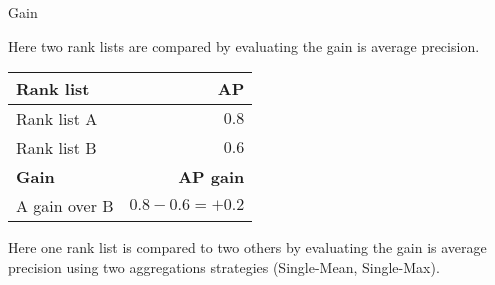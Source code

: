 \begin{example}
  \centering
  \caption{Gain}
  \label{ex:gain}

  \begin{subexample}{\linewidth}
    \centering

    Here two rank lists are compared by evaluating the gain is average precision.

    \vspace{0.2cm}

    \begin{tabular}{l r}
      \toprule
      \textbf{Rank list} & \textbf{AP} \\
      \midrule
      Rank list A & $0.8$ \\
      Rank list B & $0.6$ \\
      \midrule
      \textbf{Gain} & \textbf{AP gain} \\
      A gain over B & $0.8 - 0.6 = +0.2$ \\
      \bottomrule
    \end{tabular}
  \end{subexample}

  \vspace{0.5cm}

  \begin{subexample}{\linewidth}
    \centering

    Here one rank list is compared to two others by evaluating the gain is average precision using two aggregations strategies (Single-Mean, Single-Max).

    \vspace{0.2cm}

  \end{subexample}

\end{example}
